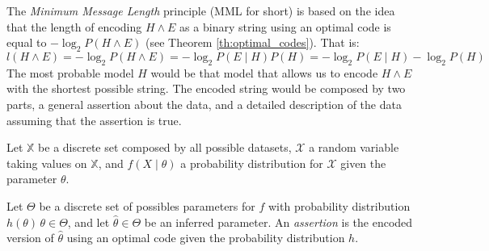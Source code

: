 The \emph{Minimum Message Length} principle (MML for short) is based on the idea that the length of encoding $H \wedge E$ as a binary string using an optimal code is equal to $- \log_2 P ( H \wedge E )$ (see Theorem \ref{th:optimal_codes}). That is:
\[
    l(H \wedge E) = - \log_2 P ( H \wedge E ) = - \log_2 P( E \mid H ) P(H) = - \log_2 P( E \mid H ) - \log_2 P(H)
\]
The most probable model $H$ would be that model that allows us to encode $H \wedge E$ with the shortest possible string. The encoded string would be composed by two parts, a general assertion about the data, and a detailed description of the data assuming that the assertion is true.

Let $\mathbb{X}$ be a discrete set composed by all possible datasets, $\mathcal{X}$ a random variable taking values on $\mathbb{X}$, and $f(X \mid \theta)$ a probability distribution for $\mathcal{X}$ given the parameter $\theta$.

\begin{definition}
    Let $\Theta$ be a discrete set of possibles parameters for $f$ with probability distribution $h(\theta) \, \theta \in \Theta$, and let $\hat\theta \in \Theta$ be an inferred parameter. An \emph{assertion} is the encoded version of $\hat\theta$ using an optimal code given the probability distribution $h$.
\end{definition}

